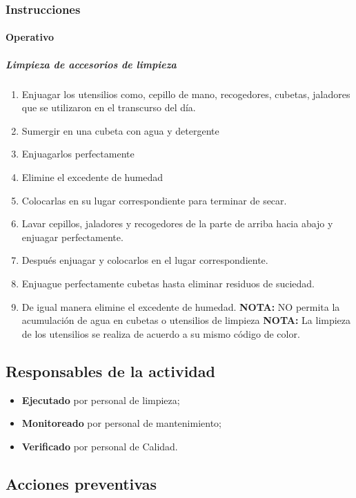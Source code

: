 \subsubsection{Instrucciones}

\paragraph{Operativo}

\subparagraph{Limpieza de accesorios de limpieza}

\begin{enumerate}
	\item Enjuagar los utensilios como, cepillo de mano, recogedores, cubetas, jaladores que se utilizaron en el transcurso del día.
	\item Sumergir en una cubeta con agua y detergente
	\item Enjuagarlos perfectamente
	\item Elimine el excedente de humedad
	\item Colocarlas en su lugar correspondiente para terminar de secar.
	\item Lavar cepillos, jaladores y recogedores de la parte de arriba hacia abajo y enjuagar perfectamente.
	\item Después enjuagar y colocarlos en el lugar correspondiente.
	\item Enjuague perfectamente cubetas hasta eliminar residuos de suciedad.
	\item De igual manera elimine el excedente de humedad.
\textbf{NOTA:} NO permita la acumulación de agua en cubetas o utensilios de limpieza
\textbf{NOTA:} La limpieza de los utensilios se realiza de acuerdo a su mismo código de color.
\end{enumerate}

\subsection{Responsables de la actividad}

\begin{itemize}
	\item \textbf{Ejecutado} por personal de limpieza;
	\item \textbf{Monitoreado} por personal de mantenimiento;
	\item \textbf{Verificado} por personal de Calidad.
\end{itemize}

\subsection{Acciones preventivas}

